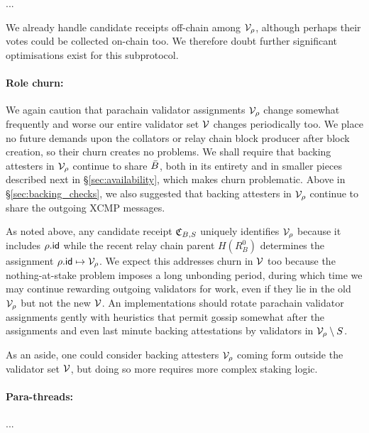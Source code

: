 ...

We already handle candidate receipts off-chain among $\mathcal{V}_{\rho}$, although perhaps their votes could be collected on-chain too.  We therefore doubt further significant optimisations exist for this subprotocol.

\smallskip
\paragraph{Role churn:}

We again caution that parachain validator assignments $\mathcal{V}_{\rho}$ change somewhat frequently and worse our entire validator set $\mathcal{V}$ changes periodically too.  We place no future demands upon the collators or relay chain block producer after block creation, so their churn creates no problems.  We shall require that backing attesters in $\mathcal{V}_{\rho}$ continue to share $\bar{B}$, both in its entirety and in smaller pieces described next in \S\ref{sec:availability}, which makes churn problematic.  Above in \S\ref{sec:backing_checks}, we also suggested that backing attesters in $\mathcal{V}_{\rho}$ continue to share the outgoing XCMP messages.

As noted above, any candidate receipt $\mathfrak{C}_{B,S}$ uniquely identifies $\mathcal{V}_{\rho}$ because it includes $\rho.\mathsf{id}$ while the recent relay chain parent $H(R^0_B)$ determines the assignment $\rho.\mathsf{id} \mapsto \mathcal{V}_{\rho}$.
We expect this addresses churn in $\mathcal{V}$ too because the nothing-at-stake problem imposes a long unbonding period, during which time we may continue rewarding outgoing validators for work, even if they lie in the old $\mathcal{V}_{\rho}$ but not the new $\mathcal{V}$.   
An implementations should rotate parachain validator assignments gently with heuristics that permit gossip somewhat after the assignments and even last minute backing attestations by validators in $\mathcal{V}_{\rho} \setminus S$.

As an aside, one could consider backing attesters $\mathcal{V}_{\rho}$ coming form outside the validator set $\mathcal{V}$, but doing so more requires more complex staking logic. 

\smallskip
\paragraph{Para-threads:}

...
